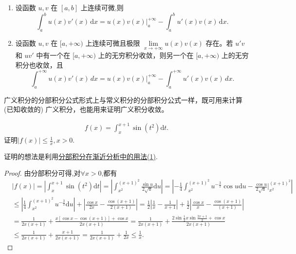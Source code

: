 \documentclass[../../main.tex]{subfiles}
\begin{document}
\begin{theorem}[分部积分公式]\label{theorem:分部积分公式}
\begin{enumerate}
\item 设函数 \( u, v \) 在 \([a, b]\) 上连续可微,则
\[
\int_a^b{u\left( x \right) v' \left( x \right) \,\mathrm{d}x}=u\left( x \right) v\left( x \right) \Big|_{a}^{+\infty}-\int_a^b{u'\left( x \right) v\left( x \right) \,\mathrm{d}x}.
\]

\item 设函数 \( u, v \) 在 \([a, +\infty)\) 上连续可微且极限 \( \lim\limits_{x \to +\infty} u(x)v(x) \) 存在。若 \( u'v \) 和 \( uv' \) 中有一个在 \([a, +\infty)\) 上的无穷积分收敛，则另一个在 \([a, +\infty)\) 上的无穷积分也收敛，且
\[
\int_a^{+\infty} u(x)v'(x) \, dx = u(x)v(x) \Big |_a^{+\infty} - \int_a^{+\infty} u'(x)v(x) \, dx.
\]
\end{enumerate}
\end{theorem}
\begin{remark}
广义积分的分部积分公式形式上与常义积分的分部积分公式一样，既可用来计算 (已知收敛的) 广义积分，也能用来证明广义积分收敛。
\end{remark}

\begin{example}
\begin{align*}
f\left( x \right) =\int_x^{x+1}{\sin \left( t^2 \right) \mathrm{d}t}.
\end{align*}
证明$\left| f\left( x \right) \right|\le \frac{1}{x},x>0$.
\end{example}
\begin{note}
证明的想法是利用\hyperref[分部积分在渐近分析中的用法(1)]{分部积分在渐近分析中的用法(1)}.
\end{note}
\begin{proof}
由分部积分可得,对$\forall x>0$,都有
\begin{align*}
&\left| f\left( x \right) \right|=\left| \int_x^{x+1}{\sin \left( t^2 \right) \mathrm{d}t} \right|=\left| \int_{x^2}^{\left( x+1 \right) ^2}{\frac{\sin u}{2\sqrt{u}}\mathrm{d}u} \right|=\left| -\frac{1}{4}\int_{x^2}^{\left( x+1 \right) ^2}{u^{-\frac{3}{2}}\cos u\mathrm{d}u}-\frac{\cos u}{2\sqrt{u}}\Big|_{x^2}^{\left( x+1 \right) ^2} \right|
\\
&\leqslant \left| \frac{1}{4}\int_{x^2}^{\left( x+1 \right) ^2}{u^{-\frac{3}{2}}\mathrm{d}u} \right|+\left| \frac{\cos x}{2x}-\frac{\cos \left( x+1 \right)}{2\left( x+1 \right)} \right|=\frac{1}{2}\left| \frac{1}{x}-\frac{1}{x+1} \right|+\frac{1}{2}\left| \frac{\cos x}{x}-\frac{\cos \left( x+1 \right)}{\left( x+1 \right)} \right|
\\
&=\frac{1}{2x\left( x+1 \right)}+\frac{x\left[ \cos x-\cos \left( x+1 \right) \right] +\cos x}{2x\left( x+1 \right)}=\frac{1}{2x\left( x+1 \right)}+\frac{2\sin \frac{1}{2}x\sin \frac{2x+1}{2}+\cos x}{2x\left( x+1 \right)}
\\
&\le \frac{1}{2x\left( x+1 \right)}+\frac{x+1}{2x\left( x+1 \right)}=\frac{1}{2x\left( x+1 \right)}+\frac{1}{2x}\leqslant \frac{1}{x}.
\end{align*}
\end{proof}
\end{document}
